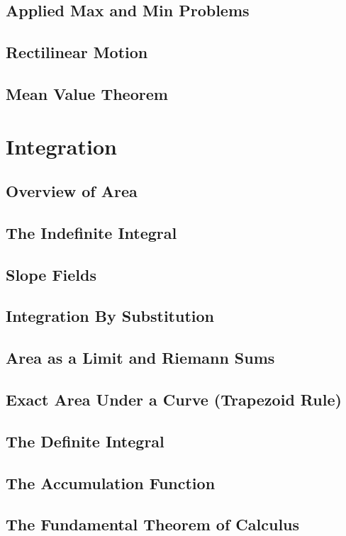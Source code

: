 \documentclass[letterpaper]{report}
\theoremstyle{definition}
\begin{document}
\section{Applied Max and Min Problems}
\section{Rectilinear Motion}
\section{Mean Value Theorem}

\chapter{Integration}
\section{Overview of Area}
\section{The Indefinite Integral}
\section{Slope Fields}
\section{Integration By Substitution}
\section{Area as a Limit and Riemann Sums}
\section{Exact Area Under a Curve (Trapezoid Rule)}
\section{The Definite Integral}
\section{The Accumulation Function}
\section{The Fundamental Theorem of Calculus}
\end{document}
